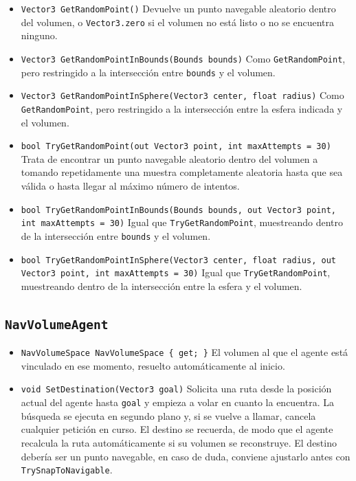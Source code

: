 \begin{itemize}
    Devuelve el punto hallado en \texttt{result} y retorna \texttt{true} si tiene éxito, o \texttt{false} si el volumen no está listo, \texttt{maxDistance} es negativo o no hay ningún vóxel libre dentro del rango.
    \item \texttt{Vector3 GetRandomPoint()} Devuelve un punto navegable aleatorio dentro del volumen, o \texttt{Vector3.zero} si el volumen no está listo o no se encuentra ninguno.
    \item \texttt{Vector3 GetRandomPointInBounds(Bounds bounds)} Como \texttt{GetRandomPoint}, pero restringido a la intersección entre \texttt{bounds} y el volumen.
    \item \texttt{Vector3 GetRandomPointInSphere(Vector3 center, float radius)} Como \texttt{GetRandomPoint}, pero restringido a la intersección entre la esfera indicada y el volumen.
    \item \texttt{bool TryGetRandomPoint(out Vector3 point, int maxAttempts = 30)} Trata de encontrar un punto navegable aleatorio dentro del volumen a tomando repetidamente una muestra completamente aleatoria hasta que sea válida o hasta llegar al máximo número de intentos.
    \item \texttt{bool TryGetRandomPointInBounds(Bounds bounds, out Vector3 point, int maxAttempts = 30)} Igual que \texttt{TryGetRandomPoint}, muestreando dentro de la intersección entre \texttt{bounds} y el volumen.
    \item \texttt{bool TryGetRandomPointInSphere(Vector3 center, float radius, out Vector3 point, int maxAttempts = 30)} Igual que \texttt{TryGetRandomPoint}, muestreando dentro de la intersección entre la esfera y el volumen.
\end{itemize}

\subsection{\texttt{NavVolumeAgent}}

\begin{itemize}
    \item \texttt{NavVolumeSpace NavVolumeSpace \{ get; \}} El volumen al que el agente está vinculado en ese momento, resuelto automáticamente al inicio.
    \item \texttt{void SetDestination(Vector3 goal)} Solicita una ruta desde la posición actual del agente hasta \texttt{goal} y empieza a volar en cuanto la encuentra.
    La búsqueda se ejecuta en segundo plano y, si se vuelve a llamar, cancela cualquier petición en curso.
    El destino se recuerda, de modo que el agente recalcula la ruta automáticamente si su volumen se reconstruye.
    El destino debería ser un punto navegable, en caso de duda, conviene ajustarlo antes con \texttt{TrySnapToNavigable}.
\end{itemize}
